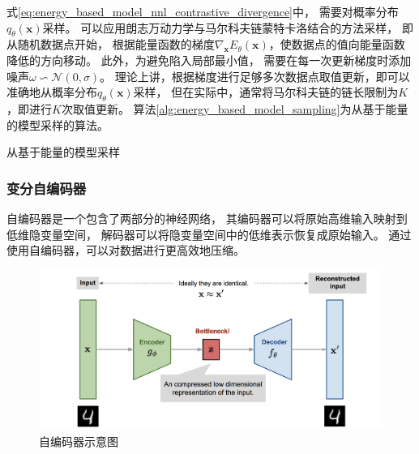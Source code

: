 式{\ref{eq:energy_based_model_nnl_contrastive_divergence}}中，
需要对概率分布{$q_{\theta}(\bm{x})$}采样。
可以应用朗志万动力学与马尔科夫链蒙特卡洛结合的方法采样，
即从随机数据点开始，
根据能量函数的梯度{$\nabla_{\bm{x}}E_{\theta}(\bm{x})$}，使数据点的值向能量函数降低的方向移动。
此外，为避免陷入局部最小值，
需要在每一次更新梯度时添加噪声{$\omega \backsim \mathcal{N}(0,\sigma) $}。
理论上讲，根据梯度进行足够多次数据点取值更新，即可以准确地从概率分布{$q_{\theta}(\bm{x})$}采样，
但在实际中，通常将马尔科夫链的链长限制为{$K$}，即进行{$K$}次取值更新。
算法{\ref{alg:energy_based_model_sampling}}为从基于能量的模型采样的算法。
\begin{algorithm}[ht]
    \caption{从基于能量的模型采样}\label{alg:energy_based_model_sampling}
    \begin{algorithmic}[1]
    \ENDFOR
    \end{algorithmic}
\end{algorithm}



\subsubsection{变分自编码器}

自编码器是一个包含了两部分的神经网络，
其编码器可以将原始高维输入映射到低维隐变量空间，
解码器可以将隐变量空间中的低维表示恢复成原始输入{\cite{weng2018VAE}}。
通过使用自编码器，可以对数据进行更高效地压缩。
\begin{figure}[ht]
    \centering
    \includegraphics[width=1\textwidth]{figures/autoencoder}
    \caption{自编码器示意图}\label{fig:autoencoder}
\end{figure}

